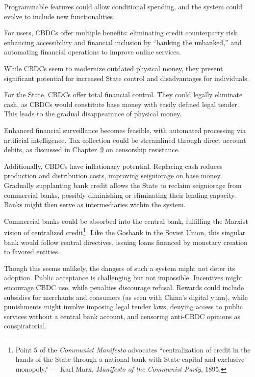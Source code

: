 \documentclass[
  a5paper,
  smalldemyvopaper,10pt,twoside,onecolumn,openright,extrafontsizes,hidelinks]{memoir}
\begin{document}
Programmable features could allow conditional spending, and the system
could evolve to include new functionalities.

For users, CBDCs offer multiple benefits: eliminating credit
counterparty risk, enhancing accessibility and financial inclusion by
``banking the unbanked,'' and automating financial operations to improve
online services.

While CBDCs seem to modernize outdated physical money, they present
significant potential for increased State control and disadvantages for
individuals.

For the State, CBDCs offer total financial control. They could legally
eliminate cash, as CBDCs would constitute base money with easily defined
legal tender. This leads to the gradual disappearance of physical money.

Enhanced financial surveillance becomes feasible, with automated
processing via artificial intelligence. Tax collection could be
streamlined through direct account debits, as discussed in
Chapter~\hyperref[ch:censure]{9} on censorship resistance.

Additionally, CBDCs have inflationary potential. Replacing cash reduces
production and distribution costs, improving seigniorage on base money.
Gradually supplanting bank credit allows the State to reclaim
seigniorage from commercial banks, possibly diminishing or eliminating
their lending capacity. Banks might then serve as intermediaries within
the system.

Commercial banks could be absorbed into the central bank, fulfilling the
Marxist vision of centralized credit\footnote{Point 5 of the
  \emph{Communist Manifesto} advocates ``centralization of credit in the
  hands of the State through a national bank with State capital and
  exclusive monopoly.'' --- Karl Marx, \emph{Manifesto of the Communist
  Party}, 1895.}. Like the Gosbank in the Soviet Union, this singular
bank would follow central directives, issuing loans financed by monetary
creation to favored entities.

Though this seems unlikely, the dangers of such a system might not deter
its adoption. Public acceptance is challenging but not impossible.
Incentives might encourage CBDC use, while penalties discourage refusal.
Rewards could include subsidies for merchants and consumers (as seen
with China's digital yuan), while punishments might involve imposing
legal tender laws, denying access to public services without a central
bank account, and censoring anti-CBDC opinions as conspiratorial.
\end{document}
